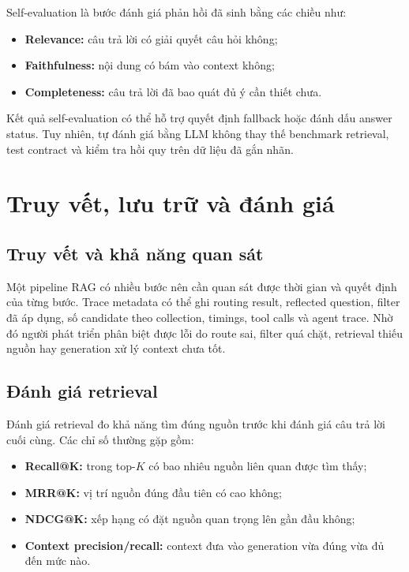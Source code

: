 \documentclass[../DoAn.tex]{subfiles}
\begin{document}
Self-evaluation là bước đánh giá phản hồi đã sinh bằng các chiều như:

\begin{itemize}
    \item \textbf{Relevance:} câu trả lời có giải quyết câu hỏi không;
    \item \textbf{Faithfulness:} nội dung có bám vào context không;
    \item \textbf{Completeness:} câu trả lời đã bao quát đủ ý cần thiết chưa.
\end{itemize}

Kết quả self-evaluation có thể hỗ trợ quyết định fallback hoặc đánh dấu answer
status. Tuy nhiên, tự đánh giá bằng LLM không thay thế benchmark retrieval, test
contract và kiểm tra hồi quy trên dữ liệu đã gắn nhãn.

\section{Truy vết, lưu trữ và đánh giá}

\subsection{Truy vết và khả năng quan sát}

Một pipeline RAG có nhiều bước nên cần quan sát được thời gian và quyết định của
từng bước. Trace metadata có thể ghi routing result, reflected question, filter
đã áp dụng, số candidate theo collection, timings, tool calls và agent trace.
Nhờ đó người phát triển phân biệt được lỗi do route sai, filter quá chặt, retrieval
thiếu nguồn hay generation xử lý context chưa tốt.

\subsection{Đánh giá retrieval}

Đánh giá retrieval đo khả năng tìm đúng nguồn trước khi đánh giá câu trả lời cuối
cùng. Các chỉ số thường gặp gồm:

\begin{itemize}
    \item \textbf{Recall@K:} trong top-$K$ có bao nhiêu nguồn liên quan được tìm
    thấy;
    \item \textbf{MRR@K:} vị trí nguồn đúng đầu tiên có cao không;
    \item \textbf{NDCG@K:} xếp hạng có đặt nguồn quan trọng lên gần đầu không;
    \item \textbf{Context precision/recall:} context đưa vào generation vừa đúng
    vừa đủ đến mức nào.
\end{itemize}
\end{document}
